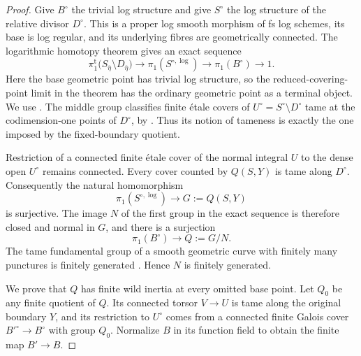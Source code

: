 \begin{proof}
Give $B^\circ$ the trivial log structure and give $S^\circ$
the log structure of the relative divisor $D^\circ$.
This is a proper log smooth morphism of fs log schemes, its
base is log regular, and its underlying fibres are geometrically
connected.  The logarithmic homotopy theorem gives an exact
sequence
\[
 \pi_1^{\mathrm t}\bigl(S_{\overline\eta}\setminus
                       D_{\overline\eta}\bigr)
 \longrightarrow \pi_1(S^{\circ,\log})
 \longrightarrow \pi_1(B^\circ)\longrightarrow1.
\]
Here the base geometric point has trivial log structure, so
the reduced-covering-point limit in the theorem has the
ordinary geometric point as a terminal object.  We use
\cite[Proposition 2.1 and Theorem 2.3, pp. 13--16]{Hoshi2006B}.
The middle group classifies finite \'etale covers of
$U^\circ=S^\circ\setminus D^\circ$ tame at the codimension-one
points of $D^\circ$, by
\cite[Proposition A.10, pp. 57--58]{Hoshi2006B}.
Thus its notion of tameness is exactly the one imposed by
the fixed-boundary quotient.

Restriction of a connected finite \'etale cover of the normal
integral $U$ to the dense open $U^\circ$ remains connected.
Every cover counted by $Q(S,Y)$ is tame along $D^\circ$.
Consequently the natural homomorphism
\[
             \pi_1(S^{\circ,\log})\longrightarrow G:=Q(S,Y)
\]
is surjective.  The image $N$ of the first group in the exact
sequence is therefore closed and normal in $G$, and there is
a surjection
\[
                    \pi_1(B^\circ)\longrightarrow Q:=G/N.
\]
The tame fundamental group of a smooth geometric curve with
finitely many punctures is finitely generated
\cite[XIII, Corollary 2.12, pp. 392--393]{SGA1}.
Hence $N$ is finitely generated.

We prove that $Q$ has finite wild inertia at every omitted
base point.  Let $Q_0$ be any finite quotient of $Q$.
Its connected torsor $V\to U$ is tame along the original
boundary $Y$, and its restriction to $U^\circ$ comes from a
connected finite Galois cover $B'^\circ\to B^\circ$ with group
$Q_0$.  Normalize $B$ in its function field to obtain the
finite map $B'\to B$.


\end{proof}
